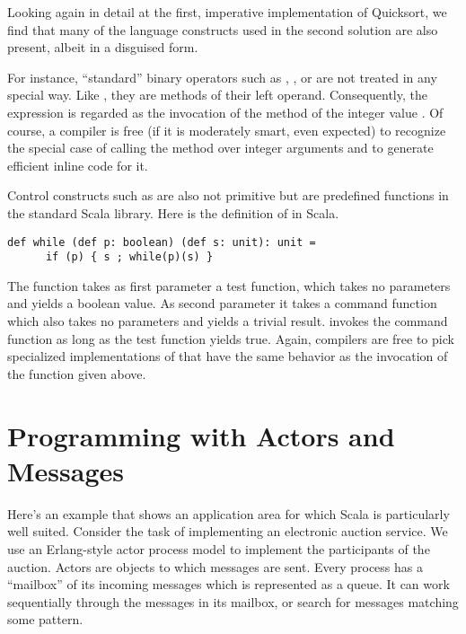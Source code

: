 Looking again in detail at the first, imperative implementation of
Quicksort, we find that many of the language constructs used in the
second solution are also present, albeit in a disguised form.

For instance, ``standard'' binary operators such as \code{+},
\code{-}, or \code{<} are not treated in any special way. Like
, they are methods of their left operand. Consequently,
the expression  is regarded as the invocation
 of the \code{+} method of the integer value .
Of course, a compiler is free (if it is moderately smart, even expected)
to recognize the special case of calling the \code{+} method over
integer arguments and to generate efficient inline code for it.

Control constructs such as  are also not primitive but are
predefined functions in the standard Scala library. Here is the
definition of  in Scala.
\begin{lstlisting}
def while (def p: boolean) (def s: unit): unit =
      if (p) { s ; while(p)(s) }
\end{lstlisting}
The  function takes as first parameter a test function,
which takes no parameters and yields a boolean value. As second
parameter it takes a command function which also takes no parameters
and yields a trivial result.  invokes the command function
as long as the test function yields true. Again, compilers are free to
pick specialized implementations of  that have the same
behavior as the invocation of the function given above.

\chapter{Programming with Actors and Messages}
\label{chap:example-auction}

Here's an example that shows an application area for which Scala is
particularly well suited. Consider the task of implementing an
electronic auction service. We use an Erlang-style actor process
model to implement the participants of the auction. Actors are
objects to which messages are sent. Every process has a ``mailbox'' of
its incoming messages which is represented as a queue. It can work
sequentially through the messages in its mailbox, or search for
messages matching some pattern.

